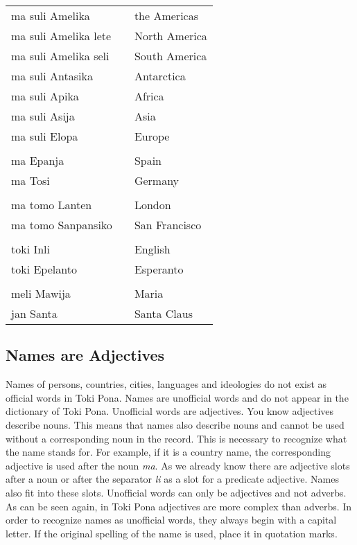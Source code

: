 \begin{supertabular}{p{2,5cm}|ll}
    ma suli Amelika      &  & the Americas  \\
    ma suli Amelika lete &  & North America \\
    ma suli Amelika seli &  & South America \\
    ma suli Antasika     &  & Antarctica    \\
    ma suli Apika        &  & Africa        \\
    ma suli Asija        &  & Asia          \\
    ma suli Elopa        &  & Europe        \\
                         &  &               \\
    ma Epanja            &  & Spain         \\
    ma Tosi              &  & Germany       \\
                         &  &               \\
    ma tomo Lanten       &  & London        \\
    ma tomo Sanpansiko   &  & San Francisco \\
                         &  &               \\
    toki Inli            &  & English       \\
    toki Epelanto        &  & Esperanto     \\
                         &  &               \\
    meli Mawija          &  & Maria         \\
    jan Santa            &  & Santa Claus   \\
\end{supertabular}

\newpage

\subsection*{Names are Adjectives}
\label{'unofficial_words_intro'}
Names of persons, countries, cities, languages and ideologies do not exist as official words in Toki Pona.
Names are unofficial words and do not appear in the dictionary of Toki Pona.
Unofficial words are adjectives.
You know adjectives describe nouns.
This means that names also describe nouns and cannot be used without a corresponding noun in the record.
This is necessary to recognize what the name stands for.
For example, if it is a country name, the corresponding adjective is used after the noun \textit{ma}.
As we already know there are adjective slots after a noun or after the separator \textit{li} as a slot for a predicate adjective.
Names also fit into these slots.
Unofficial words can only be adjectives and not adverbs.
As can be seen again, in Toki Pona adjectives are more complex than adverbs.
In order to recognize names as unofficial words, they always begin with a capital letter.
If the original spelling of the name is used, place it in quotation marks.

